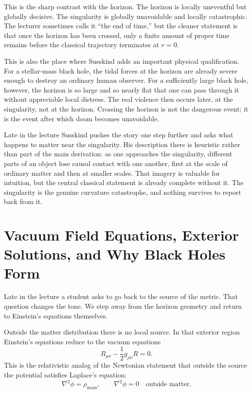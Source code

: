 This is the sharp contrast with the horizon. The horizon is locally uneventful but globally decisive. The singularity is globally unavoidable and locally catastrophic. The lecturer sometimes calls it ``the end of time,'' but the cleaner statement is that once the horizon has been crossed, only a finite amount of proper time remains before the classical trajectory terminates at \(r=0\).

This is also the place where Susskind adds an important physical qualification. For a stellar-mass black hole, the tidal forces at the horizon are already severe enough to destroy an ordinary human observer. For a sufficiently large black hole, however, the horizon is so large and so nearly flat that one can pass through it without appreciable local distress. The real violence then occurs later, at the singularity, not at the horizon. Crossing the horizon is not the dangerous event; it is the event after which doom becomes unavoidable.

Late in the lecture Susskind pushes the story one step further and asks what happens to matter near the singularity. His description there is heuristic rather than part of the main derivation: as one approaches the singularity, different parts of an object lose causal contact with one another, first at the scale of ordinary matter and then at smaller scales. That imagery is valuable for intuition, but the central classical statement is already complete without it. The singularity is the genuine curvature catastrophe, and nothing survives to report back from it.

\section{Vacuum Field Equations, Exterior Solutions, and Why Black Holes Form}

Late in the lecture a student asks to go back to the source of the metric. That question changes the tone. We step away from the horizon geometry and return to Einstein’s equations themselves.

Outside the matter distribution there is no local source. In that exterior region Einstein’s equations reduce to the vacuum equations
\begin{equation}
R_{\mu\nu}-\frac{1}{2}g_{\mu\nu}R=0.
\end{equation}
This is the relativistic analog of the Newtonian statement that outside the source the potential satisfies Laplace’s equation:
\begin{equation}
\nabla^2\phi=\rho_{\mathrm{mass}},
\qquad
\nabla^2\phi=0
\quad \text{outside matter.}
\end{equation}

